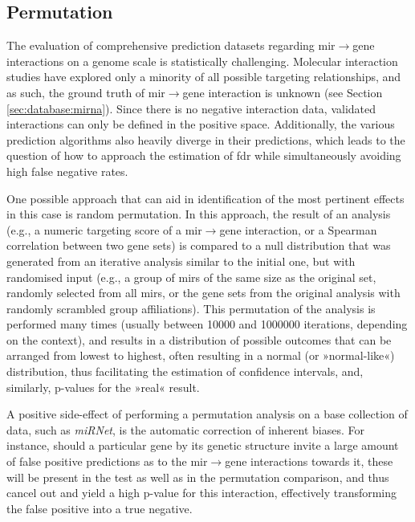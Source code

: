 \begin{method}

\subsection{Permutation}
The evaluation of comprehensive prediction datasets regarding \ac{mir}$\to$gene interactions on a genome scale is statistically challenging. Molecular interaction studies have explored only a minority of all possible targeting relationships, and as such, the ground truth of \ac{mir}$\to$gene interaction is unknown (see Section \ref{sec:database:mirna}). Since there is no negative interaction data, validated interactions can only be defined in the positive space. Additionally, the various prediction algorithms also heavily diverge in their predictions, which leads to the question of how to approach the estimation of \acf{fdr} while simultaneously avoiding high false negative rates.

One possible approach that can aid in identification of the most pertinent effects in this case is random permutation. In this approach, the result of an analysis (e.g., a numeric targeting score of a \ac{mir}$\to$gene interaction, or a Spearman correlation between two gene sets) is compared to a null distribution that was generated from an iterative analysis similar to the initial one, but with randomised input (e.g., a group of \acp{mir} of the same size as the original set, randomly selected from all \acp{mir}, or the gene sets from the original analysis with randomly scrambled group affiliations). This permutation of the analysis is performed many times (usually between \num{10000} and \num{1000000} iterations, depending on the context), and results in a distribution of possible outcomes that can be arranged from lowest to highest, often resulting in a normal (or »normal-like«) distribution, thus facilitating the estimation of confidence intervals, and, similarly, p-values for the »real« result.

A positive side-effect of performing a permutation analysis on a base collection of data, such as \textit{miRNet}, is the automatic correction of inherent biases. For instance, should a particular gene by its genetic structure invite a large amount of false positive predictions as to the \ac{mir}$\to$gene interactions towards it, these will be present in the test as well as in the permutation comparison, and thus cancel out and yield a high p-value for this interaction, effectively transforming the false positive into a true negative.


\end{method}

